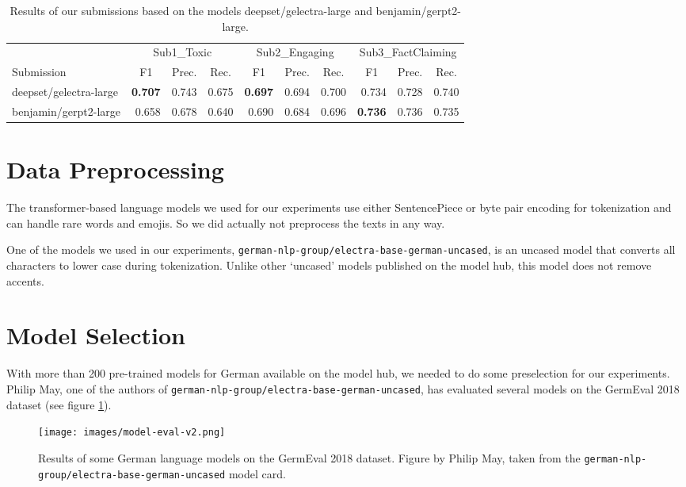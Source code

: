 \documentclass[11pt,a4paper]{article}
\begin{document}
\begin{table*}[t]
  \begin{tabular}{lrrrrrrrrr}
    & \multicolumn{3}{c}{Sub1\_Toxic} & \multicolumn{3}{c}{Sub2\_Engaging} & \multicolumn{3}{c}{Sub3\_FactClaiming} \\ 
    Submission & \multicolumn{1}{c}{F1} & \multicolumn{1}{c}{Prec.} & \multicolumn{1}{c}{Rec.} & 
                 \multicolumn{1}{c}{F1} & \multicolumn{1}{c}{Prec.} & \multicolumn{1}{c}{Rec.} & 
                 \multicolumn{1}{c}{F1} & \multicolumn{1}{c}{Prec.} & \multicolumn{1}{c}{Rec.} \\
    \hline
    deepset/gelectra-large & \textbf{0.707} & 0.743 & 0.675 & \textbf{0.697} & 0.694 & 0.700 & 0.734 & 0.728 & 0.740 \\
    benjamin/gerpt2-large & 0.658 & 0.678 & 0.640 & 0.690 & 0.684 & 0.696 & \textbf{0.736} & 0.736 & 0.735
  \end{tabular}
  \caption{\label{tab:results}Results of our submissions based on the models deepset/gelectra-large and benjamin/gerpt2-large.}
\end{table*}

\section{Data Preprocessing}
The transformer-based language models we used for our experiments use either SentencePiece \cite{SentencePiece} or 
byte pair encoding \cite{bpe} for tokenization and can handle rare words and emojis. So we did actually not preprocess the texts in any way.

One of the models we used in our experiments, \texttt{german-nlp-group/electra-base-german-uncased}, is an uncased model that converts all characters 
to lower case during tokenization. Unlike other `uncased' models published on the model hub, this model does not remove accents.

\section{Model Selection}
\label{model-selection}
With more than 200 pre-trained models for German available on the model hub, we needed to do some 
preselection for our experiments. Philip May, one of the authors of \texttt{german-nlp-group/electra-base-german-uncased}, has evaluated several 
models on the GermEval 2018 dataset (see figure \ref{model-eval}).

\begin{figure}[h]
  \texttt{[image: images/model-eval-v2.png]}
  \caption{ \label{model-eval} Results of some German language models on the GermEval 2018 dataset. Figure by Philip May, taken from the 
  \texttt{german-nlp-group/electra-base-german-uncased} model card.}
\end{figure}
\end{document}
